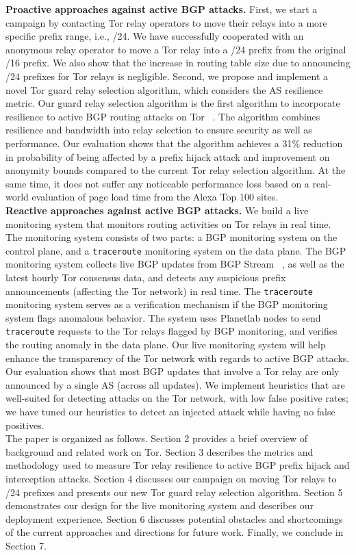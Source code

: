 \textbf{Proactive approaches against active BGP attacks.} First, we start a campaign by contacting Tor relay operators to move their relays into a more specific prefix range, i.e., /24. We have successfully cooperated with an anonymous relay operator to move a Tor relay into a /24 prefix from the original /16 prefix. We also show that the increase in routing table size due to announcing /24 prefixes for Tor relays is negligible. Second, we propose and implement a novel Tor guard relay selection algorithm, which considers the AS resilience metric. Our guard relay selection algorithm is the first algorithm to incorporate resilience to active BGP routing attacks on Tor ~\cite{sun2015raptor}. The algorithm combines resilience and bandwidth into relay selection to ensure security as well as performance. Our evaluation shows that the algorithm achieves a 31\% reduction in probability of being affected by a prefix hijack attack and improvement on anonymity bounds compared to the current Tor relay selection algorithm. At the same time, it does not suffer any noticeable performance loss based on a real-world evaluation of page load time from the Alexa Top 100 sites. 
\\
\textbf{Reactive approaches against active BGP attacks.} We build a live monitoring system that monitors routing activities on Tor relays in real time. The monitoring system consists of two parts: a BGP monitoring system on the control plane, and a {\tt traceroute} monitoring system on the data plane. The BGP monitoring system collects live BGP updates from BGP Stream ~\cite{bgpstream}, as well as the latest hourly Tor consensus data, and detects any suspicious prefix announcements (affecting the Tor network) in real time. The {\tt traceroute} monitoring system serves as a verification mechanism if the BGP monitoring system flags anomalous behavior. The system uses Planetlab nodes to send {\tt traceroute} requests to the Tor relays flagged by BGP monitoring, and verifies the routing anomaly in the data plane. Our live monitoring system will help enhance the transparency of the Tor network with regards to active BGP attacks.  Our evaluation shows that most BGP updates that involve a Tor relay are only announced by a single AS (across all updates).  We implement heuristics that are well-suited for detecting attacks on the Tor network, with low false positive rates; we have tuned our heuristics to detect an injected attack while having no false positives.
\\
The paper is organized as follows. Section 2 provides a brief overview of background and related work on Tor.  Section 3 describes the metrics and methodology used to measure Tor relay resilience to active BGP prefix hijack and interception attacks. Section 4 discusses our campaign on moving Tor relays to /24 prefixes and presents our new Tor guard relay selection algorithm. Section 5 demonstrates our design for the live monitoring system and describes our deployment experience. Section 6 discusses potential obstacles and shortcomings of the current approaches and directions for future work. Finally, we conclude in Section 7. 
